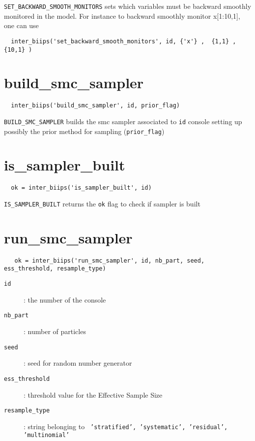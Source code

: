\documentclass[11pt]{article}
\begin{document}
   \texttt{SET\_BACKWARD\_SMOOTH\_MONITORS} sets which variables must be backward smoothly monitored in the model. For instance to backward smoothly monitor x[1:10,1], one can use
 \begin{lstlisting}
  inter_biips('set_backward_smooth_monitors', id, {'x'} ,  {1,1} , {10,1} )
 \end{lstlisting}

\section{build\_smc\_sampler}

 \begin{lstlisting}
  inter_biips('build_smc_sampler', id, prior_flag)
 \end{lstlisting}
  \texttt{BUILD\_SMC\_SAMPLER} builds the smc sampler associated to \texttt{id} console setting up possibly the prior method for sampling (\texttt{prior\_flag})

\section{is\_sampler\_built}

 \begin{lstlisting}
  ok = inter_biips('is_sampler_built', id)
 \end{lstlisting}
  \texttt{IS\_SAMPLER\_BUILT} returns the \texttt{ok} flag to check if sampler is built
\section{run\_smc\_sampler}

 \begin{lstlisting}
   ok = inter_biips('run_smc_sampler', id, nb_part, seed, ess_threshold, resample_type)
 \end{lstlisting}
 
   \begin{description}
     \item[\texttt{id}] : the number of the console
     \item[\texttt{nb\_part}] : number of particles 
     \item[\texttt{seed}] : seed for random number generator
     \item[\texttt{ess\_threshold}] : threshold value for the Effective Sample Size
     \item[\texttt{resample\_type}] : string belonging to \texttt{ 'stratified', 'systematic', 'residual', 'multinomial' } 
   
   \end{description}
\end{document}
